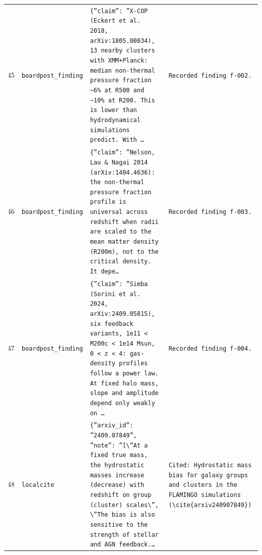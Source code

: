 \documentclass[11pt,a4paper]{article}
\begin{document}
\begin{longtable}{@{}p{}p{}p{}p{}@{}}
45 & \texttt{board}\newline\texttt{post\_\allowbreak{}finding} & \texttt{\{''claim'':\allowbreak{} ''X-COP (Eckert et al. 2018,\allowbreak{} arXiv:\allowbreak{}1805.00034)\allowbreak{},\allowbreak{} 13 nearby clusters with XMM+Planck:\allowbreak{} median non-thermal pressure fraction \textasciitilde{}\allowbreak{}6\% at R500 and \textasciitilde{}\allowbreak{}10\% at R200. This is lower than hydrodynamical simulations predict. With \ldots{}\allowbreak{}} & \texttt{Recorded finding f-002.} \\
46 & \texttt{board}\newline\texttt{post\_\allowbreak{}finding} & \texttt{\{''claim'':\allowbreak{} ''Nelson,\allowbreak{} Lau \& Nagai 2014 (arXiv:\allowbreak{}1404.4636)\allowbreak{}:\allowbreak{} the non-thermal pressure fraction profile is universal across redshift when radii are scaled to the mean matter density (R200m)\allowbreak{},\allowbreak{} not to the critical density. It depe\ldots{}\allowbreak{}} & \texttt{Recorded finding f-003.} \\
47 & \texttt{board}\newline\texttt{post\_\allowbreak{}finding} & \texttt{\{''claim'':\allowbreak{} ''Simba (Sorini et al. 2024,\allowbreak{} arXiv:\allowbreak{}2409.05815)\allowbreak{},\allowbreak{} six feedback variants,\allowbreak{} 1e11 \textless{}\allowbreak{} M200c \textless{}\allowbreak{} 1e14 Msun,\allowbreak{} 0 \textless{}\allowbreak{} z \textless{}\allowbreak{} 4:\allowbreak{} gas-density profiles follow a power law. At fixed halo mass,\allowbreak{} slope and amplitude depend only weakly on \ldots{}\allowbreak{}} & \texttt{Recorded finding f-004.} \\
48 & \texttt{local}\newline\texttt{cite} & \texttt{\{''arxiv\_\allowbreak{}id'':\allowbreak{} ''2409.07849'',\allowbreak{} ''note'':\allowbreak{} ''[\textbackslash{}\allowbreak{}''At a fixed true mass,\allowbreak{} the hydrostatic masses increase (decrease)\allowbreak{} with redshift on group (cluster)\allowbreak{} scales\textbackslash{}\allowbreak{}'',\allowbreak{} \textbackslash{}\allowbreak{}''The bias is also sensitive to the strength of stellar and AGN feedback.\ldots{}\allowbreak{}} & \texttt{Cited:\allowbreak{} Hydrostatic mass bias for galaxy groups and clusters in the FLAMINGO simulations (\textbackslash{}\allowbreak{}cite\{arxiv240907849\}\allowbreak{})\allowbreak{}} \\

\end{longtable}
\end{document}
